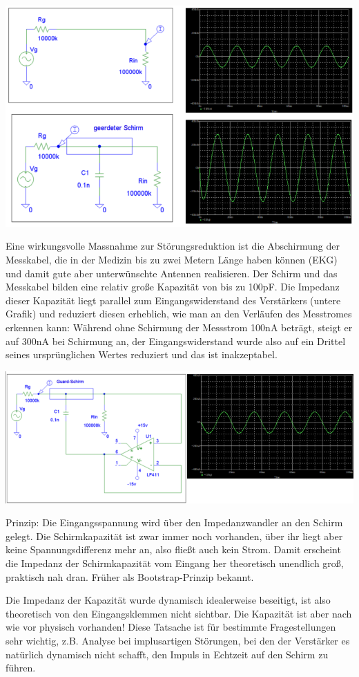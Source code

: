 \documentclass[a4paper]{article}
\begin{document}
\begin{multicols}{3}
  \begin{itemize*}
    \item \includegraphics[width=.5\linewidth]{Assets/Biosignalverarbeitung-guarding.png}
    \item Eine wirkungsvolle Massnahme zur Störungsreduktion ist die Abschirmung der Messkabel, die in der Medizin bis zu zwei Metern Länge haben können (EKG) und damit gute aber unterwünschte Antennen realisieren. Der Schirm und das Messkabel bilden eine relativ große Kapazität von bis zu 100pF. Die Impedanz dieser Kapazität liegt parallel zum Eingangswiderstand des Verstärkers (untere Grafik) und reduziert diesen erheblich, wie man an den Verläufen des Messtromes erkennen kann: Während ohne Schirmung der Messstrom 100nA beträgt, steigt er auf 300nA bei Schirmung an, der Eingangswiderstand wurde also auf ein Drittel seines ursprünglichen Wertes reduziert und das ist inakzeptabel.
    \item \includegraphics[width=.5\linewidth]{Assets/Biosignalverarbeitung-guarding2.png}
    \item Prinzip: Die Eingangsspannung wird über den Impedanzwandler an den Schirm gelegt. Die Schirmkapazität ist zwar immer noch vorhanden, über ihr liegt aber keine Spannungsdifferenz mehr an, also fließt auch kein Strom. Damit erscheint die Impedanz der Schirmkapazität vom Eingang her theoretisch unendlich groß, praktisch nah dran. Früher als Bootstrap-Prinzip bekannt.
    \item Die Impedanz der Kapazität wurde dynamisch idealerweise beseitigt, ist also theoretisch von den Eingangsklemmen nicht sichtbar. Die Kapazität ist aber nach wie vor physisch vorhanden! Diese Tatsache ist für bestimmte Fragestellungen sehr wichtig, z.B. Analyse bei implusartigen Störungen, bei den der Verstärker es natürlich dynamisch nicht schafft, den Impuls in Echtzeit auf den Schirm zu führen.
  \end{itemize*}


\end{multicols}
\end{document}
